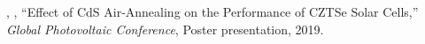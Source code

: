 \begin{pubSubsectionNum}
  \item \hyeonminjeon, , ``Effect of CdS Air‐Annealing on the Performance of CZTSe Solar Cells,'' \textit{Global Photovoltaic Conference}, Poster presentation, 2019.
\end{pubSubsectionNum}

